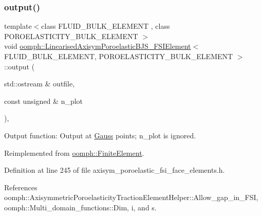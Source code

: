 \subsubsection{\texorpdfstring{output()}{output()}\hspace{0.1cm}{\footnotesize\ttfamily [2/4]}}
{\footnotesize\ttfamily template$<$class F\+L\+U\+I\+D\+\_\+\+B\+U\+L\+K\+\_\+\+E\+L\+E\+M\+E\+NT , class P\+O\+R\+O\+E\+L\+A\+S\+T\+I\+C\+I\+T\+Y\+\_\+\+B\+U\+L\+K\+\_\+\+E\+L\+E\+M\+E\+NT $>$ \\
void \hyperlink{classoomph_1_1LinearisedAxisymPoroelasticBJS__FSIElement}{oomph\+::\+Linearised\+Axisym\+Poroelastic\+B\+J\+S\+\_\+\+F\+S\+I\+Element}$<$ F\+L\+U\+I\+D\+\_\+\+B\+U\+L\+K\+\_\+\+E\+L\+E\+M\+E\+NT, P\+O\+R\+O\+E\+L\+A\+S\+T\+I\+C\+I\+T\+Y\+\_\+\+B\+U\+L\+K\+\_\+\+E\+L\+E\+M\+E\+NT $>$\+::output (\begin{DoxyParamCaption}\item[{std\+::ostream \&}]{outfile,  }\item[{const unsigned \&}]{n\+\_\+plot }\end{DoxyParamCaption})\hspace{0.3cm}{\ttfamily [inline]}, {\ttfamily [virtual]}}



Output function\+: Output at \hyperlink{classoomph_1_1Gauss}{Gauss} points; n\+\_\+plot is ignored. 



Reimplemented from \hyperlink{classoomph_1_1FiniteElement_afa9d9b2670f999b43e6679c9dd28c457}{oomph\+::\+Finite\+Element}.



Definition at line 245 of file axisym\+\_\+poroelastic\+\_\+fsi\+\_\+face\+\_\+elements.\+h.



References oomph\+::\+Axisymmetric\+Poroelasticity\+Traction\+Element\+Helper\+::\+Allow\+\_\+gap\+\_\+in\+\_\+\+F\+SI, oomph\+::\+Multi\+\_\+domain\+\_\+functions\+::\+Dim, i, and s.

\mbox{\label{classoomph_1_1LinearisedAxisymPoroelasticBJS__FSIElement_a91ca551e9f88bd3aeaff35aa338e2ca2}} 
